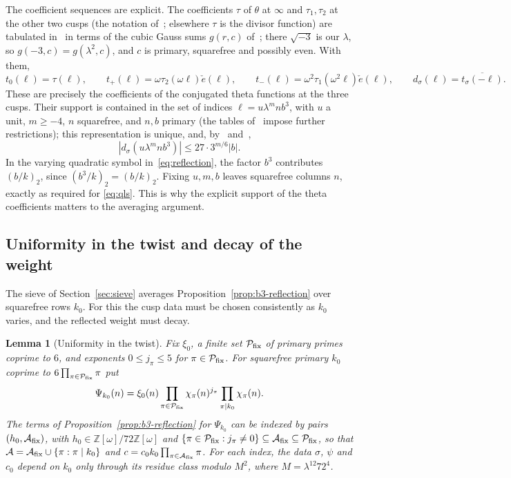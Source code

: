 \documentclass[11pt]{article}
\numberwithin{equation}{section}
\newcommand{\OO}{\mathbb Z[\omega]}
\newcommand{\ce}{\check e}
\newtheorem{lemma}{Lemma}
\begin{document}
The coefficient sequences are explicit. The coefficients $\tau$ of
$\theta$ at $\infty$ and $\tau_1,\tau_2$ at the other two cusps (the notation
of~\cite{QF}; elsewhere $\tau$ is the divisor function) are
tabulated in~\cite[Theorem~23, (5.7), (5.9), (5.10)]{QF} in terms of the
cubic Gauss sums $g(r,c)$ of~\cite[(5.5)]{QF}; there $\sqrt{-3}$ is our
$\lambda$, so $g(-3,c)=g(\lambda^2,c)$, and $c$ is primary, squarefree and
possibly even. With them,
\begin{equation}\label{eq:d098}
 t_0(\ell)=\tau(\ell),\qquad
 t_+(\ell)=\omega\tau_2(\omega\ell)\ce(\ell),\qquad
 t_-(\ell)=\omega^2\tau_1(\omega^2\ell)\ce(\ell),\qquad
 d_\sigma(\ell)=\overline{t_\sigma(-\ell)}.
\end{equation}
These are precisely the coefficients of the conjugated theta functions
at the three cusps. Their support is contained in the set of indices
$\ell=u\lambda^mnb^3$, with $u$ a unit, $m\ge-4$, $n$ squarefree,
and $n,b$ primary (the tables of~\cite{QF} impose further restrictions);
this representation is unique, and, by~\cite[Corollary~24]{QF}
and~\cite[Lemma~6.4]{OAI1112},
\begin{equation}\label{eq:d099}
 |d_\sigma(u\lambda^mnb^3)|\le27\cdot3^{m/6}|b|.
\end{equation}
In the varying quadratic symbol in~\eqref{eq:reflection}, the factor
$b^3$ contributes $(b/k)_2$, since $(b^3/k)_2=(b/k)_2$.
Fixing $u,m,b$ leaves squarefree columns $n$, exactly as required for
\eqref{eq:qls}. This is why the explicit support of the theta
coefficients matters to the averaging argument.

\subsection{Uniformity in the twist and decay of the weight}\label{sec:b3-lemmas}

The sieve of Section~\ref{sec:sieve} averages
Proposition~\ref{prop:b3-reflection} over squarefree rows $k_0$. For this
the cusp data must be chosen consistently as $k_0$ varies, and the
reflected weight must decay.

\begin{lemma}[Uniformity in the twist]\label{lem:b3-uniform}
Fix $\xi_0$, a finite set $\mathcal P_{\rm fix}$ of primary primes
coprime to $6$, and exponents $0\le j_\pi\le5$ for
$\pi\in\mathcal P_{\rm fix}$. For squarefree primary $k_0$ coprime to
$6\prod_{\pi\in\mathcal P_{\rm fix}}\pi$ put
\begin{equation}\label{eq:d100}
 \Psi_{k_0}(n)=\xi_0(n)\prod_{\pi\in\mathcal P_{\rm fix}}\chi_\pi(n)^{j_\pi}
 \prod_{\pi\mid k_0}\chi_\pi(n).
\end{equation}
The terms of Proposition~\ref{prop:b3-reflection} for $\Psi_{k_0}$ can
be indexed by pairs $(h_0,\mathcal A_{\rm fix})$, with $h_0\in\OO/72\OO$
and
$\{\pi\in\mathcal P_{\rm fix}:j_\pi\ne0\}\subseteq\mathcal A_{\rm fix}
\subseteq\mathcal P_{\rm fix}$, so that
$\mathcal A=\mathcal A_{\rm fix}\cup\{\pi:\pi\mid k_0\}$ and
$c=c_0k_0\prod_{\pi\in\mathcal A_{\rm fix}}\pi$. For each index, the
data $\sigma$, $\psi$ and $c_0$ depend on $k_0$ only through its residue
class modulo $M^2$, where $M=\lambda^{12}72^4$.
\end{lemma}
\end{document}

